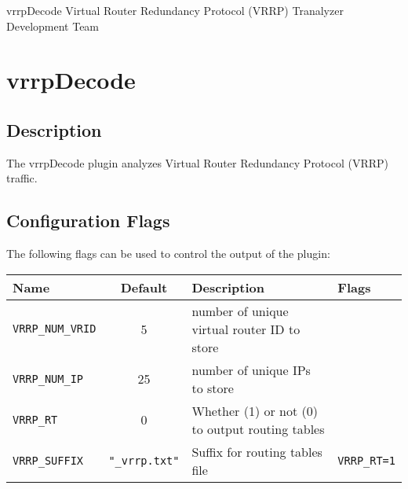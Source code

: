\documentclass[documentation]{subfiles}
\begin{document}
\trantitle
    {vrrpDecode} %
    {Virtual Router Redundancy Protocol (VRRP)} %
    {Tranalyzer Development Team} %

\section{vrrpDecode}\label{s:vrrpDecode}

\subsection{Description}
The vrrpDecode plugin analyzes Virtual Router Redundancy Protocol (VRRP) traffic.


\subsection{Configuration Flags}
The following flags can be used to control the output of the plugin:
\begin{longtable}{lcll}
    \toprule
    {\bf Name} & {\bf Default} & {\bf Description} & {\bf Flags}\\
    \midrule\endhead%
    {\tt VRRP\_NUM\_VRID} &  5 & number of unique virtual router ID to store\\
    {\tt VRRP\_NUM\_IP}   & 25 & number of unique IPs to store\\
    {\tt VRRP\_RT}        &  0 & Whether (1) or not (0) to output routing tables\\
    {\tt VRRP\_SUFFIX} & {\tt "\_vrrp.txt"} & Suffix for routing tables file & {\tt VRRP\_RT=1}\\
    \bottomrule
\end{longtable}
\end{document}
